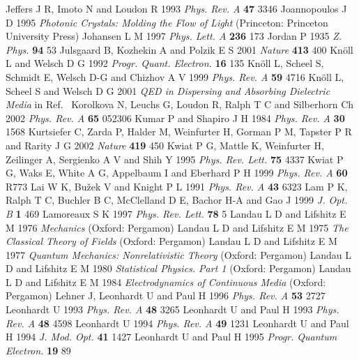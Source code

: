 \documentclass[12pt,amsmath,amssymb]{article}
\numberwithin{equation}{section}
\begin{document}
\begin{thebibliography}{999}
Jeffers J R, Imoto N and Loudon R 1993
{\it Phys. Rev. A} {\bf 47} 3346
Joannopoulos J D 1995
{\it Photonic Crystals: Molding the Flow of Light}
(Princeton: Princeton University Press)
Johansen L M 1997 {\it Phys. Lett. A} {\bf 236} 173
Jordan P 1935 {\it Z. Phys.} {\bf 94} 53
Julsgaard B, Kozhekin A and Polzik E S 2001
{\it Nature} {\bf 413} 400
Kn\"oll L and Welsch D G 1992
{\it Progr. Quant. Electron.} {\bf 16} 135
Kn\"oll L, Scheel S, Schmidt E, Welsch D-G and Chizhov A V  1999
{\it Phys. Rev. A} {\bf 59} 4716
Kn\"oll L, Scheel S and Welsch D G 2001
{\it QED in Dispersing and Absorbing Dielectric Media}
in Ref.\ \cite{PerinaEd}
Korolkova N, Leuchs G, Loudon R, Ralph T C and Silberhorn Ch 2002
{\it Phys. Rev. A} {\bf 65} 052306
Kumar P and Shapiro J H 1984
{\it Phys. Rev. A} {\bf 30} 1568
Kurtsiefer C, Zarda P, Halder M, Weinfurter H, Gorman P M,
Tapster P R and Rarity J G 2002
{\it Nature} {\bf 419} 450
Kwiat P G, Mattle K, Weinfurter H, Zeilinger A,
Sergienko A V and Shih Y 1995
{\it Phys. Rev. Lett.} {\bf 75} 4337
Kwiat P G, Waks E, White A G, Appelbaum I and Eberhard P H
1999 {\it Phys. Rev. A} {\bf 60} R773
Lai W K, Bu\v{z}ek V and Knight P L 1991
{\it Phys. Rev. A} {\bf 43} 6323
Lam P K, Ralph T C, Buchler B C, McClelland D E, Bachor H-A and Gao J
1999 {\it J. Opt. B} {\bf 1} 469
Lamoreaux S K 1997
{\it Phys. Rev. Lett.} {\bf 78} 5
Landau L D and Lifshitz E M 1976
{\it Mechanics}
(Oxford:
Pergamon)
Landau L D and Lifshitz E M 1975
{\it The Classical Theory of Fields}
(Oxford: Pergamon)
Landau L D and Lifshitz E M 1977
{\it Quantum Mechanics: Nonrelativistic Theory}
(Oxford: Pergamon)
Landau L D and Lifshitz E M 1980
{\it Statistical Physics. Part 1}
(Oxford: Pergamon)
Landau L D and Lifshitz E M 1984
{\it Electrodynamics of Continuous Media}
(Oxford: Pergamon)
Lehner J, Leonhardt U and Paul H 1996 {\it Phys. Rev. A} {\bf 53}
2727
Leonhardt U 1993 {\it Phys. Rev. A} {\bf 48} 3265
Leonhardt U and Paul H 1993 {\it Phys. Rev. A} {\bf 48} 4598
Leonhardt U 1994 {\it Phys. Rev. A} {\bf 49} 1231
Leonhardt U and Paul H 1994 {\it J. Mod. Opt.} {\bf 41} 1427
Leonhardt U and Paul H 1995 {\it Progr. Quantum Electron.} {\bf 19} 89

\end{thebibliography}
\end{document}
